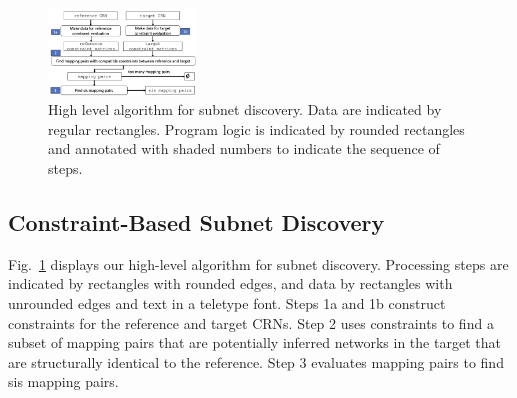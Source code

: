 \documentclass[webpdf,contemporary,large]{oup-authoring-template}
\newcommand{\fig}[1]{
  Fig.~\ref{#1}}
\theoremstyle{thmstyleone}%
\theoremstyle{thmstyletwo}%
\theoremstyle{thmstylethree}%
\begin{document}
\begin{figure}[hbtp]
\centering
\includegraphics[width=0.35\textwidth, angle=0]{figures/program-logic.png}
%               
    \caption{High level algorithm for subnet discovery. Data are indicated by regular rectangles. Program logic is indicated by rounded rectangles and annotated with shaded numbers to indicate the sequence of steps.}
    \label{fig:program-logic}
\end{figure}

\subsection{Constraint-Based Subnet Discovery}
\fig{fig:program-logic} displays our high-level algorithm for subnet discovery.
Processing steps are indicated by rectangles with rounded edges, and data by rectangles with unrounded edges and text in a teletype font. Steps 1a and 1b construct constraints for the reference and target CRNs.
Step 2 uses constraints to find a subset of mapping pairs that are potentially inferred networks in the target that are structurally identical to the reference.
Step 3 evaluates mapping pairs to find sis mapping pairs.
\end{document}
